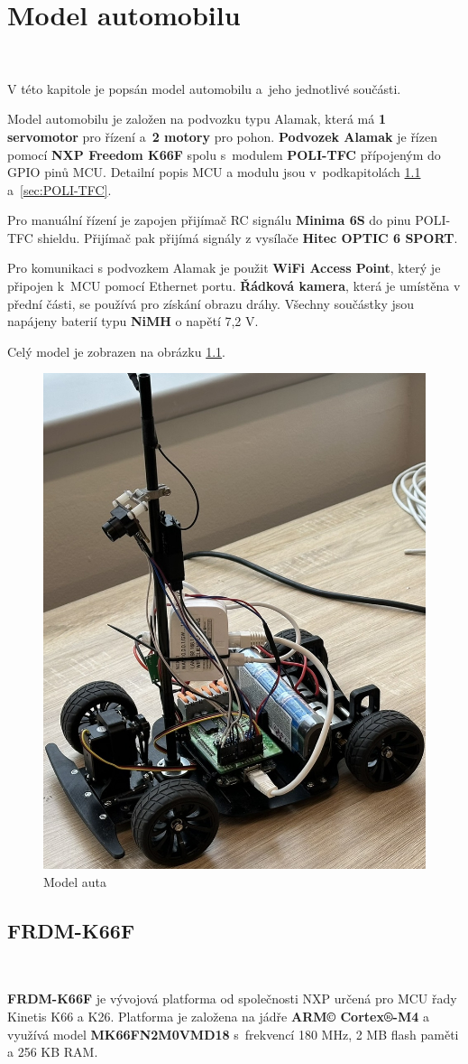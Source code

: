 \chapter{Model automobilu}
\label{sec:CarModel}\

V této kapitole je popsán model automobilu a~jeho jednotlivé součásti.

Model automobilu je založen na podvozku typu Alamak, která má \textbf{1 servomotor}
pro řízení a~\textbf{2 motory} pro pohon. \textbf{Podvozek Alamak} je řízen pomocí 
\textbf{NXP Freedom K66F} \cite{frdmk66UserGuide} spolu s~modulem \textbf{POLI-TFC} 
přípojeným do GPIO pinů MCU. Detailní popis MCU a modulu jsou v~podkapitolách 
\ref{sec:FRDM-K66F} a~\ref{sec:POLI-TFC}.

Pro manuální řízení je zapojen přijímač RC signálu \textbf{Minima 6S} do pinu
POLI-TFC shieldu. Přijímač pak přijímá signály z vysílače \textbf{Hitec OPTIC 6 
SPORT}.

Pro komunikaci s podvozkem Alamak je použit \textbf{WiFi Access Point}, který je
připojen k~MCU pomocí Ethernet portu. \textbf{Řádková kamera}, která je umístěna
v přední části, se používá pro získání obrazu dráhy. Všechny součástky
jsou napájeny baterií typu \textbf{NiMH} o napětí 7,2 V.

Celý model je zobrazen na obrázku \ref{fig:car}.
\begin{figure}[!h]
    \centering
    \includegraphics[width = .4\linewidth]{Figures/Car.jpeg}
    \caption{Model auta}
    \label{fig:car}
\end{figure}

\section{FRDM-K66F}
\label{sec:FRDM-K66F}\

\textbf{FRDM-K66F} je vývojová platforma od společnosti NXP určená pro MCU řady 
Kinetis K66 a K26. Platforma je založena na jádře \textbf{ARM© Cortex®-M4} a 
využívá model \textbf{MK66FN2M0VMD18} s~frekvencí 180 MHz, 2 MB flash paměti a 
256 KB RAM.

